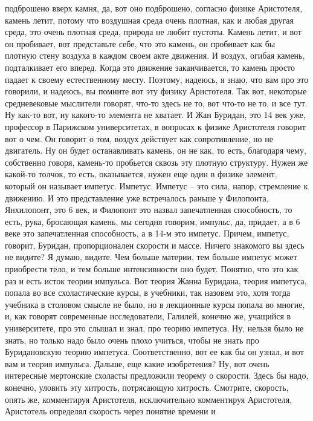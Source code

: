 подброшено вверх камня, да, вот оно подброшено, согласно физике Аристотеля,
камень летит, потому что воздушная среда очень плотная, как и любая другая
среда, это очень плотная среда, природа не любит пустоты. Камень летит, и вот он
пробивает, вот представьте себе, что это камень, он пробивает как бы плотную
стену воздуха в каждом своем акте движения. И воздух, огибая камень,
подталкивает его вперед. Когда это движение заканчивается, то камень просто
падает к своему естественному месту. Поэтому, надеюсь, я знаю, что вам про это
говорили, и надеюсь, вы помните вот эту физику Аристотеля. Так вот, некоторые
средневековые мыслители говорят, что-то здесь не то, вот что-то не то, и все
тут. Ну как-то вот, ну какого-то элемента не хватает. И Жан Буридан, это 14 век
уже, профессор в Парижском университетах, в вопросах к физике Аристотеля говорит
вот о чем. Он говорит о том, воздух действует как сопротивление, но не
двигатель. Ну он будет останавливать камень, он не как, то есть, благодаря чему,
собственно говоря, камень-то пробьется сквозь эту плотную структуру. Нужен же
какой-то толчок, то есть, оказывается, нужен еще один в физике элемент, который
он называет импетус. Импетус. Импетус – это сила, напор, стремление к движению.
И это представление уже встречалось раньше у Филопонта, Янхилопонт, это 6 век, и
Филопонт это назвал запечатленная способность, то есть, рука, бросающая камень,
мы сегодня говорим, импульс, да, придает, а в 6 веке это запечатленная
способность, а в 14-м это импетус. Причем, импетус, говорит, Буридан,
пропорционален скорости и массе. Ничего знакомого вы здесь не видите? Я думаю,
видите. Чем больше материи, тем больше импетус может приобрести тело, и тем
больше интенсивности оно будет. Понятно, что это как раз и есть исток теории
импульса. Вот теория Жанна Буридана, теория импетуса, попала во все
схоластические курсы, в учебники, так назовем это, хотя тогда учебника в
столовом смысле не было, но в лекционные курсы попала во многие, и, как говорят
современные исследователи, Галилей, конечно же, учащийся в университете, про это
слышал и знал, про теорию импетуса. Ну, нельзя было не знать, но только надо
было очень плохо учиться, чтобы не знать про Буридановскую теорию импетуса.
Соответственно, вот ее как бы он узнал, и вот вам и теория импульса. Дальше, еще
какие изобретения? Ну, вот очень интересные мертонские схоласты предложили
теорему о скорости. Здесь бы надо, конечно, уловить эту хитрость, потрясающую
хитрость. Смотрите, скорость, опять же, комментируя Аристотеля, исключительно
комментируя Аристотеля, Аристотель определял скорость через понятие времени и
